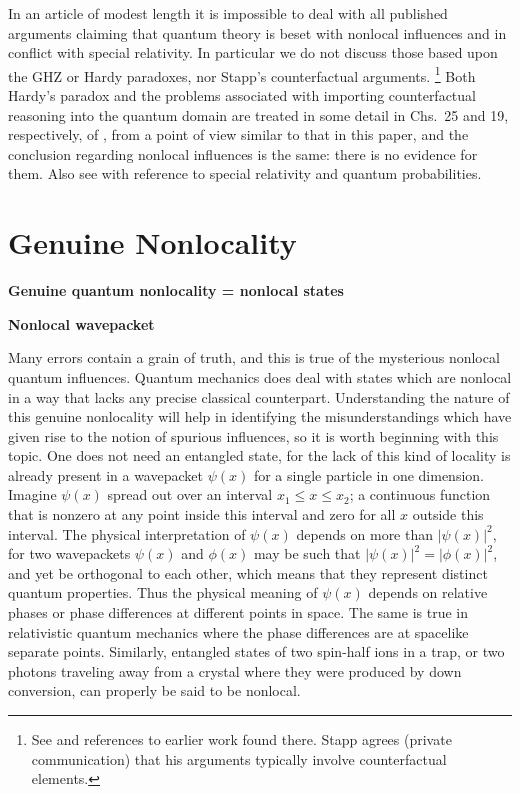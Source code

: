 \documentclass[12pt]{article} %
\def\outl#1{\par{\medskip\noindent\hspace*{.5cm}\bf
      \mathversion{bold}#1\mathversion{normal}\smallskip} }
\def\np{} \def\xa{} \def\xb{} \def\xn{} \def\xp{}
\def\outl#1{} \def\np{} \def\xa{} \def\xb{} \def\xn{} \def\xp{}
\def\outl#1{\par{\medskip\noindent\hspace*{.5cm}\bf
      \mathversion{bold}#1\mathversion{normal}\smallskip} }
\def\np{\newpage }\def\xn{\nopagebreak }\def\xp{\pagebreak }
\begin{document}
In an article of modest length it is impossible to deal with all published
arguments claiming that quantum theory is beset with nonlocal influences and
in conflict with special relativity.  In particular we do not discuss those
based upon the GHZ \cite{GrHZ89,GHSZ90} or Hardy \cite{Hrdy92} paradoxes, nor
Stapp's counterfactual arguments.%
\footnote{See \cite{Stpp06} and references to earlier work found there.  Stapp
  agrees (private communication) that his arguments typically involve
  counterfactual elements.} %
Both Hardy's paradox and the problems associated with importing counterfactual
reasoning into the quantum domain are treated in some detail in Chs.~25 and
19, respectively, of \cite{Grff02c}, from a point of view similar to that in
this paper, and the conclusion regarding nonlocal influences is the same:
there is no evidence for them.  Also see \cite{Grff02b} with reference to
special relativity and quantum probabilities.

\xb
\section{Genuine Nonlocality}
\label{sct2}
\xa

\xb
\outl{Genuine quantum nonlocality = nonlocal states}
\xa


\xb
\outl{Nonlocal wavepacket}
\xa







Many errors contain a grain of truth, and this is true of the
mysterious nonlocal quantum influences. Quantum mechanics does
deal with states which are nonlocal in a way that lacks any precise classical
counterpart.  Understanding the nature of this genuine nonlocality will help
in identifying the misunderstandings which have given rise to the notion of
spurious  influences, so it is worth beginning with this topic. 
%
One does not need an entangled state, for the lack of this kind of locality is
already present in a wavepacket $\psi(x)$ for a single particle in one
dimension.  Imagine $\psi(x)$ spread out over an interval $x_1\leq x\leq x_2$;
a continuous function that is nonzero at any point inside this interval and
zero for all $x$ outside this interval.  The physical interpretation of
$\psi(x)$ depends on more than $|\psi(x)|^2$, for two wavepackets $\psi(x)$
and $\phi(x)$ may be such that $|\psi(x)|^2=|\phi(x)|^2$, and yet be
orthogonal to each other, which means that they represent distinct quantum
properties.  Thus the physical meaning of $\psi(x)$ depends on relative phases
or phase differences at different points in space.  The same is true in
relativistic quantum mechanics where the phase differences are at spacelike
separate points.  Similarly, entangled states of two spin-half ions in a trap,
or two photons traveling away from a crystal where they were produced by down
conversion, can properly be said to be nonlocal.
\end{document}
